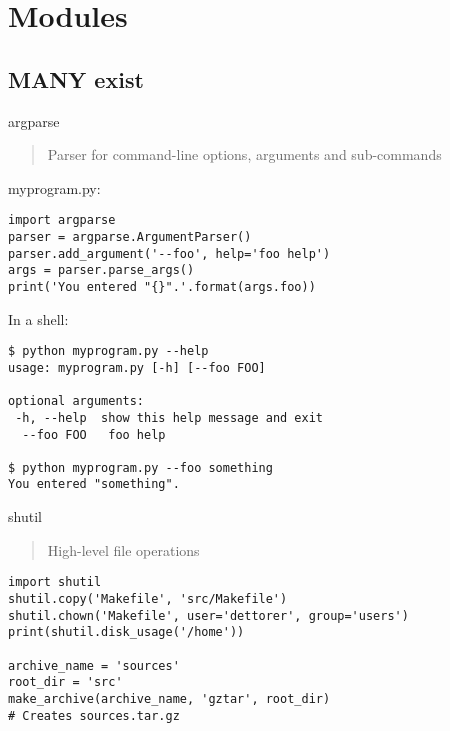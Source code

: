 \documentclass[ignorenonframetext,]{beamer}
\begin{document}
\section{Modules}
\subsection{MANY exist}

\begin{frame}[fragile]{argparse}

    \begin{quote}
    Parser for command-line options, arguments and sub-commands
    \end{quote}

    \begin{overprint}
    myprogram.py:
    \begin{tcolorbox}
    \begin{verbatim}
import argparse
parser = argparse.ArgumentParser()
parser.add_argument('--foo', help='foo help')
args = parser.parse_args()
print('You entered "{}".'.format(args.foo))
    \end{verbatim}
    \end{tcolorbox}

    In a shell:
    \begin{tcolorbox}
        \begin{Verbatim}[fontsize=\small]
$ python myprogram.py --help
usage: myprogram.py [-h] [--foo FOO]

optional arguments:
 -h, --help  show this help message and exit
  --foo FOO   foo help

$ python myprogram.py --foo something
You entered "something".
        \end{Verbatim}
    \end{tcolorbox}
    \end{overprint}
\end{frame}

\begin{frame}[fragile]{shutil}

    \begin{quote}
    High-level file operations
    \end{quote}

    \begin{tcolorbox}
    \begin{verbatim}
import shutil
shutil.copy('Makefile', 'src/Makefile')
shutil.chown('Makefile', user='dettorer', group='users')
print(shutil.disk_usage('/home'))

archive_name = 'sources'
root_dir = 'src'
make_archive(archive_name, 'gztar', root_dir)
# Creates sources.tar.gz
    \end{verbatim}
    \end{tcolorbox}
\end{frame}
\end{document}
